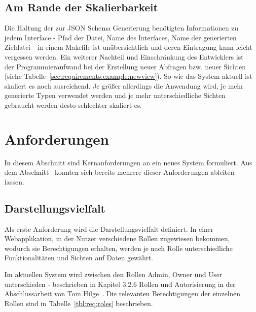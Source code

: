 \subsection{Am Rande der Skalierbarkeit}
Die Haltung der zur JSON Schema Generierung benötigten Informationen zu jedem Interface - Pfad der Datei, Name des Interfaces, Name der generierten Zieldatei -
in einem Makefile ist unübersichtlich und deren Eintragung kann leicht vergessen werden. 
Ein weiterer Nachteil und Einschränkung des Entwicklers ist der Programmieraufwand bei der Erstellung neuer Abfragen bzw. neuer Sichten (siehe Tabelle~\ref{sec:requirements:example:newview}).
So wie das System aktuell ist skaliert es noch ausreichend. Je größer allerdings die Anwendung wird, je mehr generierte Typen verwendet werden und je mehr unterschiedliche Sichten gebraucht werden desto schlechter skaliert es.

\section{Anforderungen}
\label{sec:requirements:req}
In diesem Abschnitt sind Kernanforderungen an ein neues System formuliert.
Aus dem Abschnitt~ konnten sich bereits mehrere dieser Anforderungen ableiten lassen.

\subsection{Darstellungsvielfalt}
\label{sec:requirements:req:view}
Als erste Anforderung wird die Darstellungsvielfalt definiert.
In einer Webapplikation, in der Nutzer verschiedene Rollen zugewiesen bekommen, wodurch sie Berechtigungen erhalten,
werden je nach Rolle unterschiedliche Funktionalitäten und Sichten auf Daten gewährt.

Im aktuellen System wird zwischen den Rollen Admin, Owner und User unterschieden - beschrieben in Kapitel 3.2.6 Rollen und Autorisierung
in der Abschlussarbeit von Tom Hilge~\cite{Abschlussarbeit-Tom-Hilge}.
Die relevanten Berechtigungen der einzelnen Rollen sind in Tabelle~\ref{tbl:req:roles} beschrieben.

